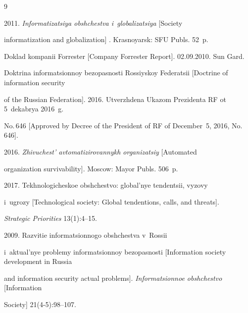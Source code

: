 {\small\frenchspacing


{%




\begin{thebibliography}{9}




   2011. \textit{Informatizatsiya obshchestva i~globalizatsiya} [Society 


informatization and globalization] . Krasnoyarsk: SFU Publs. 52~p.




  Doklad kompanii Forrester [Company Forrester Report]. 02.09.2010. Sun Gard.




  Doktrina informatsionnoy bezopasnosti Rossiyskoy Federatsii [Doctrine of information security 


of the Russian Federation]. 2016. Utverzhdena Ukazom Prezidenta RF ot 5~dekabrya 2016~g. 


No.\,646 [Approved by Decree of the President of RF of December~5, 2016, No.\,646]. 




   2016. \textit{Zhivuchest' avtomatizirovannykh organizatsiy} [Automated 


organization survivability]. Moscow: Mayor Publs. 506~p.




   2017. Tekhnologicheskoe obshchestvo: global'nye tendentsii, vyzovy 


i~ugrozy [Technological society: Global tendentions, calls, and threats]. 


\textit{Strategic Priorities} 13(1):4--15.




   2009. Razvitie informatsionnogo obshchestva v~Rossii 


i~aktual'nye problemy informatsionnoy bezopasnosti [Information society development in Russia 


and information security actual problems]. \textit{Informatsionnoe obshchestvo} [Information 


Society] 21(4-5):98--107.


\end{thebibliography}


} }








